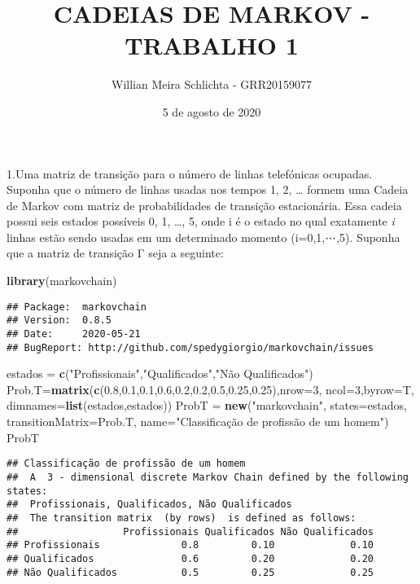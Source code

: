 \documentclass[
]{article}
\title{CADEIAS DE MARKOV - TRABALHO 1}
\author{Willian Meira Schlichta - GRR20159077}
\date{5 de agosto de 2020}
\newenvironment{Shaded}{\begin{snugshade}}{\end{snugshade}}
\newcommand{\DataTypeTok}[1]{\textcolor[rgb]{0.13,0.29,0.53}{#1}}
\newcommand{\DecValTok}[1]{\textcolor[rgb]{0.00,0.00,0.81}{#1}}
\newcommand{\FloatTok}[1]{\textcolor[rgb]{0.00,0.00,0.81}{#1}}
\newcommand{\KeywordTok}[1]{\textcolor[rgb]{0.13,0.29,0.53}{\textbf{#1}}}
\newcommand{\NormalTok}[1]{#1}
\newcommand{\StringTok}[1]{\textcolor[rgb]{0.31,0.60,0.02}{#1}}
\begin{document}
\maketitle

1.Uma matriz de transição para o número de linhas telefónicas ocupadas.
Suponha que o número de linhas usadas nos tempos 1, 2, \ldots{} formem
uma Cadeia de Markov com matriz de probabilidades de transição
estacionária. Essa cadeia possui seis estados possíveis 0, 1, \ldots, 5,
onde i é o estado no qual exatamente \emph{i} linhas estão sendo usadas
em um determinado momento (i=0,1,⋯,5). Suponha que a matriz de transição
Γ seja a seguinte:

\begin{Shaded}
\begin{Highlighting}[]
\KeywordTok{library}\NormalTok{(markovchain)}
\end{Highlighting}
\end{Shaded}

\begin{verbatim}
## Package:  markovchain
## Version:  0.8.5
## Date:     2020-05-21
## BugReport: http://github.com/spedygiorgio/markovchain/issues
\end{verbatim}

\begin{Shaded}
\begin{Highlighting}[]
\NormalTok{estados =}\StringTok{ }\KeywordTok{c}\NormalTok{(}\StringTok{"Profissionais"}\NormalTok{,}\StringTok{"Qualificados"}\NormalTok{,}\StringTok{"Não Qualificados"}\NormalTok{)}
\NormalTok{Prob.T=}\KeywordTok{matrix}\NormalTok{(}\KeywordTok{c}\NormalTok{(}\FloatTok{0.8}\NormalTok{,}\FloatTok{0.1}\NormalTok{,}\FloatTok{0.1}\NormalTok{,}\FloatTok{0.6}\NormalTok{,}\FloatTok{0.2}\NormalTok{,}\FloatTok{0.2}\NormalTok{,}\FloatTok{0.5}\NormalTok{,}\FloatTok{0.25}\NormalTok{,}\FloatTok{0.25}\NormalTok{),}\DataTypeTok{nrow=}\DecValTok{3}\NormalTok{,}
              \DataTypeTok{ncol=}\DecValTok{3}\NormalTok{,}\DataTypeTok{byrow=}\NormalTok{T, }\DataTypeTok{dimnames=}\KeywordTok{list}\NormalTok{(estados,estados))}
\NormalTok{ProbT =}\StringTok{ }\KeywordTok{new}\NormalTok{(}\StringTok{"markovchain"}\NormalTok{, }\DataTypeTok{states=}\NormalTok{estados, }\DataTypeTok{transitionMatrix=}\NormalTok{Prob.T,}
            \DataTypeTok{name=}\StringTok{"Classificação de profissão de um homem"}\NormalTok{)}
\NormalTok{ProbT}
\end{Highlighting}
\end{Shaded}

\begin{verbatim}
## Classificação de profissão de um homem 
##  A  3 - dimensional discrete Markov Chain defined by the following states: 
##  Profissionais, Qualificados, Não Qualificados 
##  The transition matrix  (by rows)  is defined as follows: 
##                  Profissionais Qualificados Não Qualificados
## Profissionais              0.8         0.10             0.10
## Qualificados               0.6         0.20             0.20
## Não Qualificados           0.5         0.25             0.25
\end{verbatim}
\end{document}
